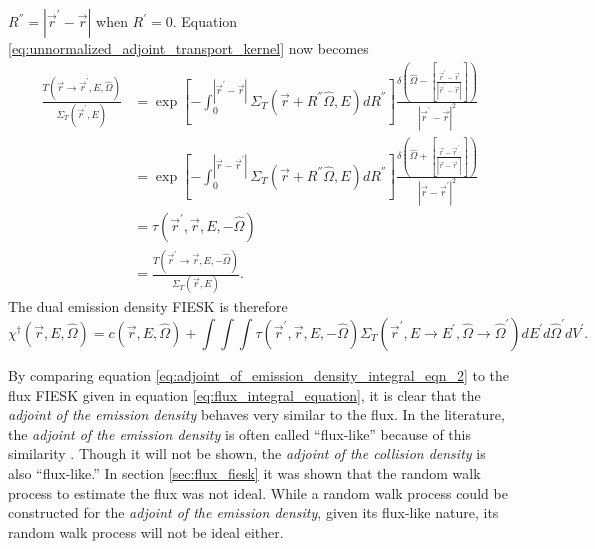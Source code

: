 $R^{''} = |\vec{r}^{'} - \vec{r}|$ when $R^{'} = 0$. Equation 
\ref{eq:unnormalized_adjoint_transport_kernel} now becomes
\begin{align}
  \frac{T(\vec{r} \to \vec{r}^{'},E,\hat{\Omega})}{\Sigma_T(\vec{r}^{'},E)} & =
  \exp{\left[-\int_0^{|\vec{r}^{'} - \vec{r}|} 
    \Sigma_T \left(\vec{r} + R^{''}\hat{\Omega},E \right) dR^{''} 
    \right]} \frac{\delta \left(\hat{\Omega} - \left[\frac{\vec{r}^{'} - \vec{r}}
      {|\vec{r}^{'} - \vec{r}|}\right]\right)}
       {|\vec{r}^{'} - \vec{r}|^2} \nonumber \\
       & = \exp{\left[-\int_0^{|\vec{r} - \vec{r}^{'}|} 
    \Sigma_T \left(\vec{r} + R^{''}\hat{\Omega},E \right) dR^{''} 
    \right]} \frac{\delta \left(\hat{\Omega} + \left[\frac{\vec{r} - \vec{r}^{'}}
      {|\vec{r} - \vec{r}^{'}|}\right]\right)}
       {|\vec{r} - \vec{r}^{'}|^2} \nonumber \\
       & = \tau(\vec{r}^{'},\vec{r},E,-\hat{\Omega}) \\
       & = \frac{T(\vec{r}^{'} \to \vec{r},E,-\hat{\Omega})}
       {\Sigma_T(\vec{r},E)}.
\end{align}
The dual emission density FIESK is therefore
\begin{equation}
  \chi^{\dagger}(\vec{r},E,\hat{\Omega}) =  c(\vec{r},E,\hat{\Omega}) +
  \int\int\int  \tau(\vec{r}^{'},\vec{r},E,-\hat{\Omega}) 
  \Sigma_T(\vec{r}^{'},E \to E^{'},\hat{\Omega} \to \hat{\Omega}^{'})
  dE^{'}d\hat{\Omega}^{'}dV^{'}.
  \label{eq:adjoint_of_emission_density_integral_eqn_2}
\end{equation}
 
By comparing equation \ref{eq:adjoint_of_emission_density_integral_eqn_2} to 
the flux FIESK given in equation \ref{eq:flux_integral_equation}, it is clear 
that the \textit{adjoint of the emission density} behaves very similar to the 
flux. In the literature, the \textit{adjoint of the emission density} is often 
called ``flux-like'' because of this similarity \citep{hoogenboom_adjoint_1977}.
Though it will not be shown, the \textit{adjoint of the collision density} is 
also ``flux-like.'' In section \ref{sec:flux_fiesk} it was shown that the random
walk process to estimate the flux was not ideal. While a random walk process 
could be constructed for the \textit{adjoint of the emission density}, given its
flux-like nature, its random walk process will not be ideal either. 

